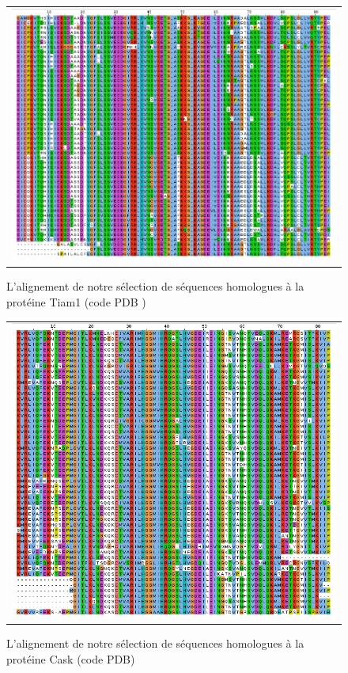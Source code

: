    \begin{figure}[t]
     \centering
     \begin{tabular}{c}
       \includegraphics[width=17cm]{homologues/TIAM1.png} \\
     \end{tabular}
     \caption{L'alignement de notre sélection de séquences homologues à la protéine Tiam1 (code PDB )}
\label{align_homo:Tiam1}
   \end{figure}
\clearpage   
   \begin{figure}[t]
     \centering
     \begin{tabular}{c}
       \includegraphics[width=17cm]{homologues/CASK.png} \\
     \end{tabular}
     \caption{L'alignement de notre sélection de séquences homologues à la protéine Cask (code PDB)}
   \label{align_homo:CASK}
   \end{figure}
   
